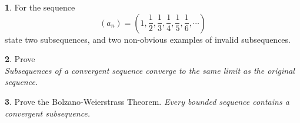 \documentclass[10pt, twocolumn]{article}
\theoremstyle{definition}
\newtheorem{q}{}
\begin{document}
		\begin{q}
			For the sequence 
			\[ \left( a _ { n } \right) = \left( 1 , \frac { 1 } { 2 } , \frac { 1 } { 3 } , \frac { 1 } { 4 } , \frac { 1 } { 5 } , \frac { 1 } { 6 } , \cdots \right) \]
			state two subsequences, and two non-obvious examples of invalid subsequences. 
		\end{q}
		\begin{q}
			Prove \\
			\textit{Subsequences of a convergent sequence converge to the same
				limit as the original sequence.}
		\end{q}
		\begin{q}
			Prove the Bolzano-Weierstrass Theorem.
			\textit{Every bounded sequence contains a convergent subsequence.}
		\end{q}
\end{document}
